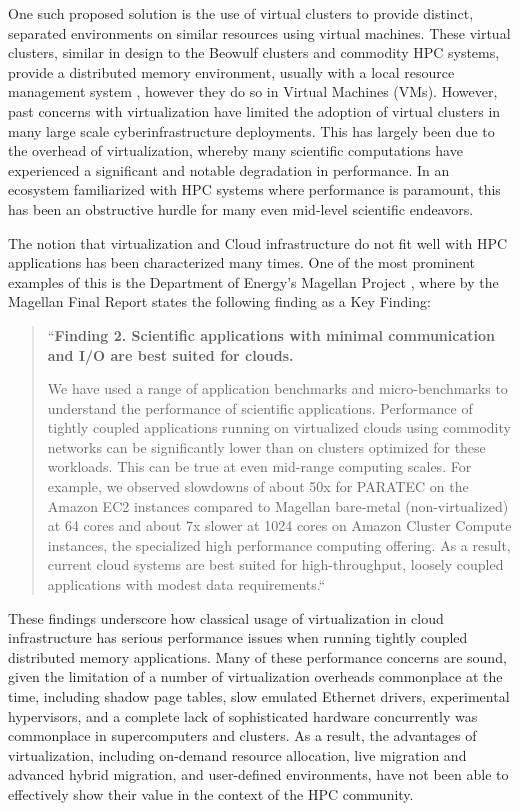 
One such proposed solution is the use of virtual clusters \cite{Foster2006} to provide distinct, separated environments on similar resources using virtual machines. These virtual clusters, similar in design to the Beowulf clusters and commodity HPC systems, provide a distributed memory environment, usually with a local resource management system \cite{czajkowski1998resource}, however they do so in Virtual Machines (VMs).  However, past concerns with virtualization have limited the adoption of virtual clusters in many large scale cyberinfrastructure deployments. This has largely been due to the overhead of virtualization, whereby many scientific computations have experienced a significant and notable degradation in performance.  In an ecosystem familiarized with HPC systems where performance is paramount, this has been an obstructive hurdle for many even mid-level scientific endeavors.

The notion that virtualization and Cloud infrastructure do not fit well with HPC applications has been characterized many times. One of the most prominent examples of this is the Department of Energy's Magellan Project \cite{www-magellan}, where by the Magellan Final Report \cite{MagellanFinal} states the following finding as a Key Finding:
  
\begin{quote}
``\textbf{Finding 2. Scientific applications with minimal communication and I/O are best suited for
clouds.}

We have used a range of application benchmarks and micro-benchmarks to understand the performance of scientific applications. Performance of tightly coupled applications running on virtualized clouds using commodity networks can be significantly lower than on clusters optimized for these workloads. This can be true at even mid-range computing scales. For example, we observed slowdowns of about 50x for PARATEC on the Amazon EC2 instances compared to Magellan bare-metal (non-virtualized) at 64 cores and about 7x slower at 1024 cores on Amazon Cluster Compute instances, the specialized high performance computing offering. As a result, current cloud systems are best suited for high-throughput, loosely coupled applications with modest data requirements.``
\end{quote}

These findings underscore how classical usage of virtualization in cloud infrastructure has serious performance issues when running tightly coupled distributed memory applications. Many of these performance concerns are sound, given the limitation of a number of virtualization overheads commonplace at the time, including shadow page tables, slow emulated Ethernet drivers, experimental hypervisors, and a complete lack of sophisticated hardware concurrently was commonplace in supercomputers and clusters.  As a result, the advantages of virtualization, including on-demand resource allocation, live migration and advanced hybrid migration, and user-defined environments, have not been able to effectively show their value in the context of the HPC community. 

